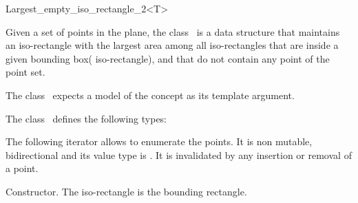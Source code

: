 

\begin{ccRefClass}{Largest_empty_iso_rectangle_2<T>}



\ccDefinition
  
Given a set of points in the plane, the class \ccRefName\ is a data
structure that maintains an iso-rectangle with the largest area among
all iso-rectangles that are inside a given bounding box( iso-rectangle), and
that do not contain any point of the point set.

The class \ccRefName\ expects a model of the concept  as its template argument.  



\ccTypes
The class \ccClassTemplateName\ defines the following types:

\ccThreeToTwo





The following iterator allows to enumerate the points. 
It is non mutable, bidirectional
and its value type is . 
It is invalidated by any insertion or removal of a point. 



\ccCreation
{}  %

{Constructor. The iso-rectangle  is the bounding rectangle.} 


\end{ccRefClass}
